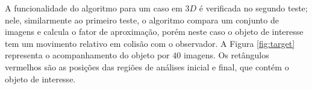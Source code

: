 A funcionalidade do algoritmo para um caso em $3D$ é verificada no segundo teste;
nele, similarmente ao primeiro teste, o algoritmo compara um conjunto de imagens 
e calcula o fator de aproximação, porém neste caso o objeto de interesse tem um movimento
relativo em colisão com o observador. A Figura \ref{fig:target} representa o 
acompanhamento do objeto por $40$ imagens. Os retângulos vermelhos
são as posições das regiões de análises inicial e final, que contém o objeto de interesse.

